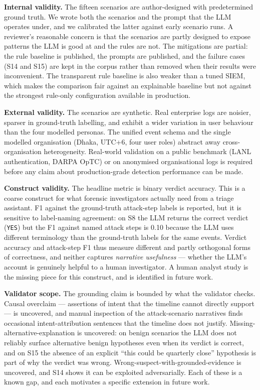 \documentclass[conference]{IEEEtran}
\begin{document}
\textbf{Internal validity.} The fifteen scenarios are author-designed with predetermined ground truth. We wrote both the scenarios and the prompt that the LLM operates under, and we calibrated the latter against early scenario runs. A reviewer's reasonable concern is that the scenarios are partly designed to expose patterns the LLM is good at and the rules are not. The mitigations are partial: the rule baseline is published, the prompts are published, and the failure cases (S14 and S15) are kept in the corpus rather than removed when their results were inconvenient. The transparent rule baseline is also weaker than a tuned SIEM, which makes the comparison fair against an explainable baseline but not against the strongest rule-only configuration available in production.

\textbf{External validity.} The scenarios are synthetic. Real enterprise logs are noisier, sparser in ground-truth labelling, and exhibit a wider variation in user behaviour than the four modelled personas. The unified event schema and the single modelled organisation (Dhaka, UTC+6, four user roles) abstract away cross-organisation heterogeneity. Real-world validation on a public benchmark (LANL authentication, DARPA OpTC) or on anonymised organisational logs is required before any claim about production-grade detection performance can be made.

\textbf{Construct validity.} The headline metric is binary verdict accuracy. This is a coarse construct for what forensic investigators actually need from a triage assistant. F1 against the ground-truth attack-step labels is reported, but it is sensitive to label-naming agreement: on S8 the LLM returns the correct verdict (\texttt{YES}) but the F1 against named attack steps is 0.10 because the LLM uses different terminology than the ground-truth labels for the same events. Verdict accuracy and attack-step F1 thus measure different and partly orthogonal forms of correctness, and neither captures \emph{narrative usefulness} --- whether the LLM's account is genuinely helpful to a human investigator. A human analyst study is the missing piece for this construct, and is identified in future work.

\textbf{Validator scope.} The grounding claim is bounded by what the validator checks. Causal overclaim --- assertions of intent that the timeline cannot directly support --- is uncovered, and manual inspection of the attack-scenario narratives finds occasional intent-attribution sentences that the timeline does not justify. Missing-alternative-explanation is uncovered: on benign scenarios the LLM does not reliably surface alternative benign hypotheses even when its verdict is correct, and on S15 the absence of an explicit ``this could be quarterly close'' hypothesis is part of why the verdict was wrong. Wrong-suspect-with-grounded-evidence is uncovered, and S14 shows it can be exploited adversarially. Each of these is a known gap, and each motivates a specific extension in future work.
\end{document}

